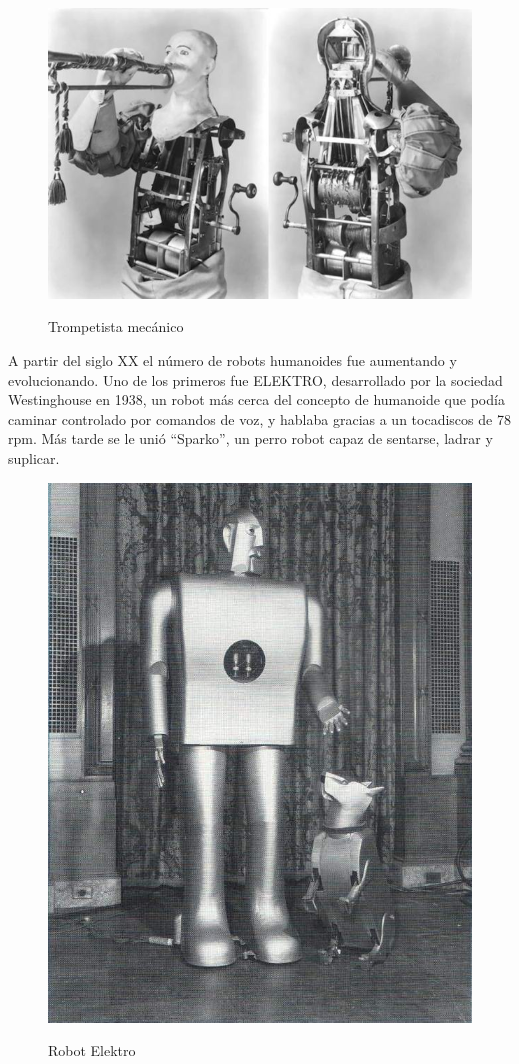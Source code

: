 \begin{figure}[H]
\centering
{\includegraphics[scale=0.3]{imagenes/apartado_2/27_trompetista_mecanico}}
\caption{Trompetista mecánico}
\label{figura27}
\end{figure}

A partir del siglo XX el número de robots humanoides fue aumentando y evolucionando. Uno de los primeros fue ELEKTRO, desarrollado por la sociedad Westinghouse en 1938, un robot más cerca del concepto de humanoide que podía caminar controlado por comandos de voz, y hablaba gracias a un tocadiscos de 78 rpm. Más tarde se le unió ``Sparko'', un perro robot capaz de sentarse, ladrar y suplicar. 

\begin{figure}[H]
\centering
{\includegraphics[scale=0.2]{imagenes/apartado_2/28_elektro_robot}}
\caption{Robot Elektro}
\label{figura28}
\end{figure}

